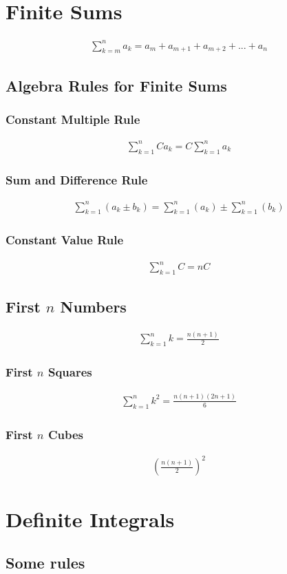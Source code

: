 \documentclass{article}
\newcommand\regsum{\sum_{k=1}^{n}}
\begin{document}
\section{Finite Sums}
    \begin{gather*}
        \sum_{k=m}^{n} a_{k} = a_{m} + a_{m+1} + a_{m+2} + ... + a_n
    \end{gather*}
    \subsection{Algebra Rules for Finite Sums}
        \subsubsection{Constant Multiple Rule}
            \begin{gather*}
                \regsum Ca_k = C \regsum a_k
            \end{gather*}
        \subsubsection{Sum and Difference Rule}
            \begin{gather*}
                \regsum (a_k\pm b_k) = \regsum(a_k) \pm \regsum(b_k)
            \end{gather*}
        \subsubsection{Constant Value Rule}
            \begin{gather*}
                \regsum C = nC
            \end{gather*}
    \subsection{First \(n\) Numbers}
        \begin{gather*}
            \regsum k = \frac{n(n+1)}{2}
        \end{gather*}
        \subsubsection{First \(n\) Squares}
            \begin{gather*}
                \regsum k^2 = \frac{n(n+1)(2n+1)}{6}
            \end{gather*}
        \subsubsection{First \(n\) Cubes}
            \begin{gather*}
                \left(\frac{n(n+1)}{2}\right)^2
            \end{gather*}
\section{Definite Integrals}
    \subsection{Some rules}
        
    
\end{document}

